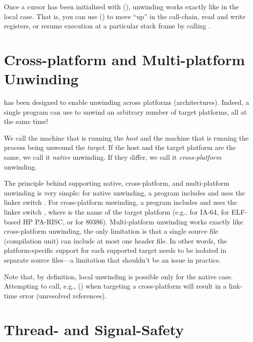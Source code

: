 \documentclass{article}
\begin{document}
Once a cursor has been initialized with (),
unwinding works exactly like in the local case.  That is, you can use
() to move ``up'' in the call-chain, read and write
registers, or resume execution at a particular stack frame by calling
.


\section{Cross-platform and Multi-platform Unwinding}

 has been designed to enable unwinding across
platforms (architectures).  Indeed, a single program can use
 to unwind an arbitrary number of target platforms,
all at the same time!

We call the machine that is running  the \emph{host}
and the machine that is running the process being unwound the
\emph{target}.  If the host and the target platform are the same, we
call it \emph{native} unwinding.  If they differ, we call it
\emph{cross-platform} unwinding.

The principle behind supporting native, cross-platform, and
multi-platform unwinding is very simple: for native unwinding, a
program includes  and uses the linker switch
.  For cross-platform unwinding, a program
includes  and uses the linker
switch , where  is the name
of the target platform (e.g.,  for IA-64, 
for ELF-based HP PA-RISC, or  for 80386).  Multi-platform
unwinding works exactly like cross-platform unwinding, the only
limitation is that a single source file (compilation unit) can include
at most one  header file.  In other words, the
platform-specific support for each supported target needs to be
isolated in separate source files---a limitation that shouldn't be an
issue in practice.

Note that, by definition, local unwinding is possible only for the
native case.  Attempting to call, e.g., () when
targeting a cross-platform will result in a link-time error
(unresolved references).


\section{Thread- and Signal-Safety}
\end{document}
